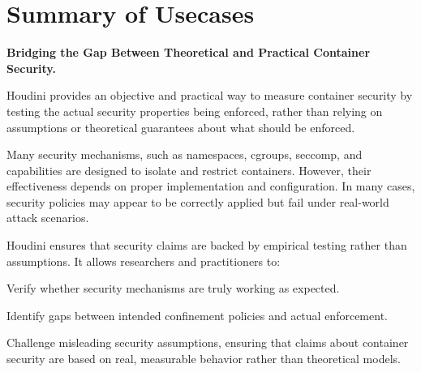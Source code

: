 \section{Summary of Usecases}
\label{sec:usecases}

\noindent\textbf{Bridging the Gap Between Theoretical and Practical Container Security.}

Houdini provides an objective and practical way to measure container security by testing the actual security properties being enforced, rather than relying on assumptions or theoretical guarantees about what should be enforced.

Many security mechanisms, such as namespaces, cgroups, seccomp, and capabilities are designed to isolate and restrict containers. However, their effectiveness depends on proper implementation and configuration. In many cases, security policies may appear to be correctly applied but fail under real-world attack scenarios.

Houdini ensures that security claims are backed by empirical testing rather than assumptions. It allows researchers and practitioners to:

\begin{dgenum}
\item Verify whether security mechanisms are truly working as expected.
\item Identify gaps between intended confinement policies and actual enforcement.
\item Challenge misleading security assumptions, ensuring that claims about container security are based on real, measurable behavior rather than theoretical models.
\end{dgenum}